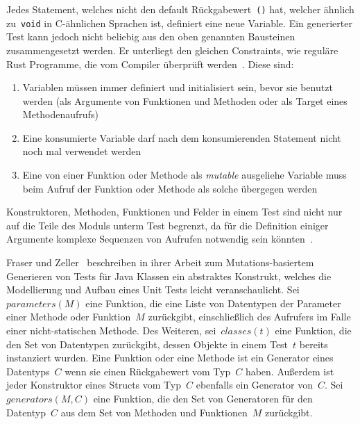 \documentclass{article}
\begin{document}
Jedes Statement, welches nicht den default Rückgabewert~\lstinline{()} hat, welcher ähnlich zu~\lstinline{void} in C-ähnlichen Sprachen ist, definiert eine neue Variable. Ein generierter Test kann jedoch nicht beliebig aus den oben genannten Bausteinen zusammengesetzt werden. Er unterliegt den gleichen Constraints, wie reguläre Rust Programme, die vom Compiler überprüft werden~\cite{Tonella2004}. Diese sind: 
\begin{enumerate}
    \item Variablen müssen immer definiert und initialisiert sein, bevor sie benutzt werden (als Argumente von Funktionen und Methoden oder als Target eines Methodenaufrufs)
    \item Eine konsumierte Variable darf nach dem konsumierenden Statement nicht noch mal verwendet werden
    \item Eine von einer Funktion oder Methode als \textit{mutable} ausgeliehe Variable muss beim Aufruf der Funktion oder Methode als solche übergegen werden
\end{enumerate}
Konstruktoren, Methoden, Funktionen und Felder in einem Test sind nicht nur auf die Teile des Moduls unterm Test begrenzt, da für die Definition einiger Argumente komplexe Sequenzen von Aufrufen notwendig sein könnten~\cite{Fraser2012}. 

Fraser und Zeller~\cite{Fraser2012} beschreiben in ihrer Arbeit zum Mutations-basiertem Generieren von Tests für Java Klassen ein abstraktes Konstrukt, welches die Modellierung und Aufbau eines Unit Tests leicht veranschaulicht. Sei~$parameters(M)$ eine Funktion, die eine Liste von Datentypen der Parameter einer Methode oder Funktion~$M$ zurückgibt, einschließlich des Aufrufers im Falle einer nicht-statischen Methode. Des Weiteren, sei~$classes(t)$ eine Funktion, die den Set von Datentypen zurückgibt, dessen Objekte in einem Test~$t$ bereits instanziert wurden. Eine Funktion oder eine Methode ist ein Generator eines Datentyps~$C$ wenn sie einen Rückgabewert vom Typ~$C$ haben. Außerdem ist jeder Konstruktor eines Structs vom Typ~$C$ ebenfalls ein Generator von~$C$. Sei~$generators(M,C)$ eine Funktion, die den Set von Generatoren für den Datentyp~$C$ aus dem Set von Methoden und Funktionen~$M$ zurückgibt. 
\end{document}

